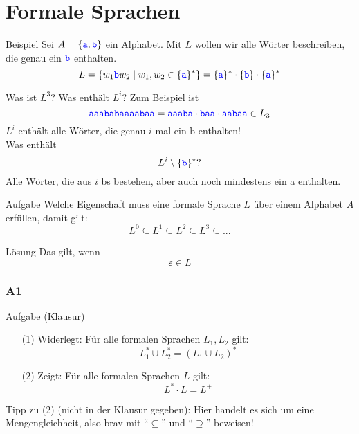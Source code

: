 \section{Formale Sprachen}

\begin{frame}{Beispiel}
	Sei $A = \left\{\hbox{\textcolor{blue}{\texttt{a}}},\hbox{\textcolor{blue}{\texttt{b}}}\right\}$ ein Alphabet. Mit $L$ wollen wir alle Wörter beschreiben, die genau ein $\hbox{\textcolor{blue}{\texttt{b}}}$ enthalten. \\ \pause
	$$ L = \left\{w_1 \hbox{\textcolor{blue}{\texttt{b}}} w_2 \mid w_1, w_2 \in \{\hbox{\textcolor{blue}{\texttt{a}}}\}^\ast \right\} = \{\hbox{\textcolor{blue}{\texttt{a}}}\}^\ast \cdot \{\hbox{\textcolor{blue}{\texttt{b}}} \} \cdot \{\hbox{\textcolor{blue}{\texttt{a}}}\}^\ast$$
	
	Was ist $L^3$? Was enthält $L^i$? \pause
	Zum Beispiel ist $$\hbox{\textcolor{blue}{\texttt{aaababaaaabaa}}} = \hbox{\textcolor{blue}{\texttt{aaaba}}} \cdot \hbox{\textcolor{blue}{\texttt{baa}}} \cdot \hbox{\textcolor{blue}{\texttt{aabaa}}} \in L_3$$ \pause
	$L^i$ enthält alle Wörter, die genau $i$-mal ein \word b enthalten! \\[1em]
	
	Was enthält $$L^i \setminus \{\hbox{\textcolor{blue}{\texttt{b}}}\}^\ast ?$$ \pause
	Alle Wörter, die aus $i$ \word bs bestehen, aber auch noch mindestens ein \word a enthalten. \\
\end{frame}

\begin{frame}{Aufgabe}
	Welche Eigenschaft muss eine formale Sprache $L$ über einem Alphabet
	$A$ erfüllen, damit gilt: $$ L^0 \subseteq L^1 \subseteq L^2 \subseteq L^3 \subseteq ... $$
	
	\pause
	\begin{block}{Lösung}
		Das gilt, wenn $$ \varepsilon \in L $$
	\end{block}
	
\end{frame}

\subsubsection{A1}
\begin{frame}{Aufgabe (Klausur)}
		\begin{itemize}
			\item[(1)] Widerlegt: Für alle formalen Sprachen $L_1 , L_2$ gilt: 
			$$L_1^\ast \cup L_2^\ast = (L_1 \cup L_2 )^\ast$$
			
			\item[(2)] Zeigt: Für alle formalen Sprachen $L$ gilt: 
				$$L^\ast \cdot L = L^+ $$ 
	\end{itemize}

	Tipp zu (2) (nicht in der Klausur gegeben): Hier handelt es sich um eine Mengengleichheit, also brav mit \enquote{$\subseteq$} und \enquote{$\supseteq$} beweisen! \smiley 
\end{frame}

